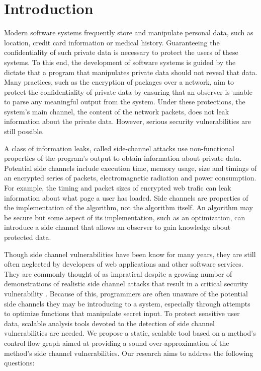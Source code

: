 \section{Introduction}

Modern software systems frequently store and manipulate personal data, such as location, credit card information or medical history.  Guaranteeing the confidentiality of such private data is necessary to protect the users of these systems.  To this end, the development of software systems is guided by the dictate that a program that manipulates private data should not reveal that data.  Many practices, such as the encryption of packages over a network, aim to protect the confidentiality of private data by ensuring that an observer is unable to parse any meaningful output from the system. Under these protections, the system's main channel, the content of the network packets, does not leak information about the private data. However, serious security vulnerabilities are still possible. 

A class of information leaks, called side-channel attacks use non-functional properties of the program's output to obtain information about private data.  Potential side channels include execution time, memory usage, size and timings of an encrypted series of packets, electromagnetic radiation and power consumption. For example, the timing and packet sizes of encrypted web trafic can leak information about what page a user has loaded. Side channels are properties of the implementation of the algorithm, not the algorithm itself. An algorithm may be secure but some aspect of its implementation, such as an optimization, can introduce a side channel that allows an observer to gain knowledge about protected data.  

Though side channel vulnerabilities have been know for many years, they are still often neglected by developers of web applications and other software services. They are commonly thought of as impratical despite a growing number of demonstrations of realistic side channel attacks that result in a critical security vulnerability \cite{timingpractical, cachepractical, ASLRtiming}. Because of this, programmers are often unaware of the potential side channels they may be introducing to a system, especially through attempts to optimize functions that manipulate secret input. To protect sensitive user data, scalable analysis tools devoted to the detection of side channel vulnerabilities are needed. We propose a static, scalable tool based on a method's control flow graph aimed at providing a sound over-approximation of the method's side channel vulnerabilities.  Our research aims to address the following questions:

